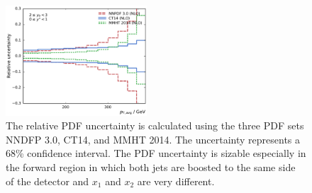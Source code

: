 \begin{figure}[htp]
    \includegraphics[width=0.47\textwidth]{figures/theory/pdf_uncert_comp_yb2ys0.pdf}
    \caption[PDF uncertainty]{The relative PDF uncertainty is calculated using the three PDF sets
    NNDFP 3.0, CT14, and MMHT 2014. The uncertainty represents a 68\% confidence
    interval. The PDF uncertainty is sizable especially in the forward region in
    which both jets  are boosted to the same side of the detector and $x_1$ and
    $x_2$ are very different.}
    \label{fig:pdf_uncertainties}
\end{figure}

